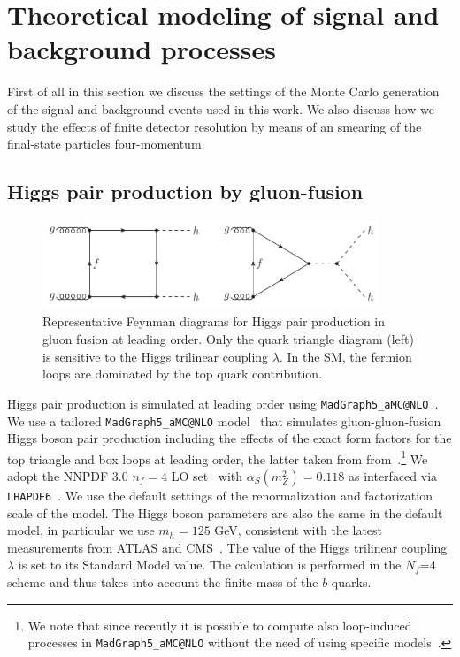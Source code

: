 

\section{Theoretical modeling of signal and background processes}
\label{mcgeneration}

First of all in this section we discuss the settings of the
Monte Carlo generation of the signal and background
events used in this work.
%
We also discuss how we study the effects of finite detector
resolution by means of an smearing of the final-state
particles four-momentum.

\subsection{Higgs pair production by gluon-fusion}


\begin{figure}[t]
\begin{center}
  \includegraphics[width=0.90\textwidth]{plots/hhFeyn.pdf}
  \caption{\small Representative Feynman diagrams
    for Higgs pair production in gluon fusion at
    leading order.
    Only the quark triangle diagram (left) is sensitive to the Higgs trilinear coupling
    $\lambda$.
    In the SM, the fermion loops are dominated by the top quark contribution.
}
\label{fig:hhFeyn}
\end{center}
\end{figure}

Higgs pair production is simulated at leading order using
{\tt MadGraph5\_aMC@NLO}~\cite{Alwall:2014hca}.
%
We use a tailored {\tt MadGraph5\_aMC@NLO} model~\cite{Maltoni:2014eza} that simulates
gluon-gluon-fusion Higgs boson pair production including the effects
of the
exact form factors for the top triangle and box loops at leading
order, the latter taken from from~\cite{Plehn:1996wb}.\footnote{We note that since recently it is possible to compute also
loop-induced processes in {\tt MadGraph5\_aMC@NLO} without the need of using specific
models~\cite{Hirschi:2015iia}.}
%
We adopt the NNPDF 3.0 $n_f = 4$ LO set~\cite{Ball:2014uwa} with
$\alpha_S(m_Z^2)=0.118$
as interfaced via {\tt LHAPDF6}~\cite{Buckley:2014ana}.
%
We use the default settings of the renormalization and factorization
scale of the model.
%
The Higgs boson parameters are also the same in the default model,
in particular we use $m_h=125$ GeV, consistent with the latest
measurements from ATLAS and CMS~\cite{Aad:2014aba,Khachatryan:2014jba}.
%
The value of the Higgs trilinear coupling $\lambda$ is set to its
Standard Model value.
%
The calculation is performed in the
$N_f$=4 scheme and thus
takes into account the finite mass of the $b$-quarks.


